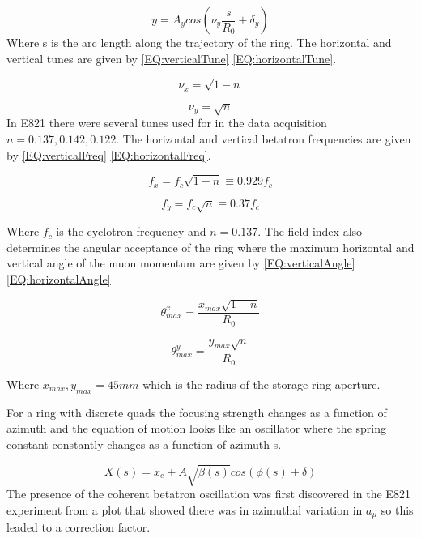\documentclass[./Thesis]{subfiles}
\begin{document}
	\begin{equation}
	\label{EQ:horizontalCBO}
	y =  A_y cos(\nu_y \frac{s}{R_0} + \delta_y)
	\end{equation}
Where s is the arc length along the trajectory of the ring. The horizontal and vertical tunes are given by \ref{EQ:verticalTune} \ref{EQ:horizontalTune}.

	\begin{equation}
	\label{EQ:verticalTune}
	\nu_x = \sqrt{1-n}
	\end{equation}

	\begin{equation}
	\label{EQ:horizontalTune}
	\nu_y = \sqrt{n}
	\end{equation}
In E821 there were several tunes used for in the data acquisition $n = 0.137, 0.142, 0.122$. The horizontal and vertical betatron frequencies are given by \ref{EQ:verticalFreq} \ref{EQ:horizontalFreq}.

	\begin{equation}
	\label{EQ:verticalFreq}
	f_x = f_c \sqrt{1-n} \equiv 0.929 f_c
	\end{equation}
	
	\begin{equation}
	\label{EQ:horizontalFreq}
	f_y = f_c \sqrt{n} \equiv 0.37f_c
	\end{equation}

Where $f_c$ is the cyclotron frequency and $n=0.137$. The field index also determines the angular acceptance of the ring where the maximum horizontal and vertical angle of the muon momentum are given by \ref{EQ:verticalAngle} \ref{EQ:horizontalAngle}

	\begin{equation}
	\label{EQ:verticalAngle}
	\theta^{x}_{max} = \frac{x_{max} \sqrt{1-n}}{R_0}
	\end{equation}

	\begin{equation}
	\label{EQ:horizontalAngle}
	\theta^{y}_{max} = \frac{y_{max} \sqrt{n}}{R_0}
	\end{equation}

Where $x_{max} ,y_{max} =  45mm$ which is the radius of the storage ring aperture.

For a ring with discrete quads the focusing strength changes as a function of azimuth and the equation of motion looks like an oscillator where the spring constant constantly changes as a function of azimuth s. 

	\begin{equation}
	X(s) = x_e + A \sqrt{\beta(s)} cos(\phi(s)+\delta)
	\end{equation}
The presence of the coherent betatron oscillation was first discovered in the E821 experiment from a plot that showed there was in azimuthal variation in $a_\mu$ so this leaded to a correction factor.
\end{document}
